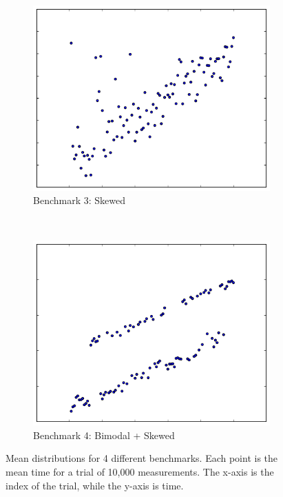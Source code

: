 \documentclass[conference]{IEEEtran}
\begin{document}
\begin{figure}
\begin{subfigure}{0.22\textwidth}
    \centering
    \includegraphics[width=\textwidth]{figures/fig1/drift_manyallocs_slow}
    \caption{Benchmark 3: Skewed}
\end{subfigure}
~
\begin{subfigure}{0.22\textwidth}
    \centering
    \includegraphics[width=\textwidth]{figures/fig1/bimodal_drift_sumindex}
    \caption{Benchmark 4: Bimodal + Skewed}
\end{subfigure}

\caption{Mean distributions for 4 different benchmarks. Each point is the mean time for a trial of 10,000 measurements. The x-axis is the index of the trial, while the y-axis is time.}
\label{fig:meandistributions}
\end{figure}
\end{document}
